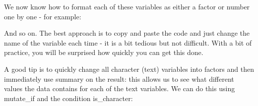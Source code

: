 \documentclass[
]{article}
\newenvironment{Shaded}{\begin{snugshade}}{\end{snugshade}}
\newcommand{\DataTypeTok}[1]{\textcolor[rgb]{0.13,0.29,0.53}{#1}}
\newcommand{\KeywordTok}[1]{\textcolor[rgb]{0.13,0.29,0.53}{\textbf{#1}}}
\newcommand{\NormalTok}[1]{#1}
\newcommand{\OperatorTok}[1]{\textcolor[rgb]{0.81,0.36,0.00}{\textbf{#1}}}
\newcommand{\StringTok}[1]{\textcolor[rgb]{0.31,0.60,0.02}{#1}}
\begin{document}
We now know how to format each of these variables as either a factor or
number one by one - for example:

\begin{Shaded}
\end{Shaded}

And so on. The best approach is to copy and paste the code and just
change the name of the variable each time - it is a bit tedious but not
difficult. With a bit of practice, you will be surprised how quickly you
can get this done.

A good tip is to quickly change all character (text) variables into
factors and then immediately use summary on the result: this allows us
to see what different values the data contains for each of the text
variables. We can do this using mutate\_if and the condition
is\_character:

\begin{Shaded}
\end{Shaded}
\end{document}
